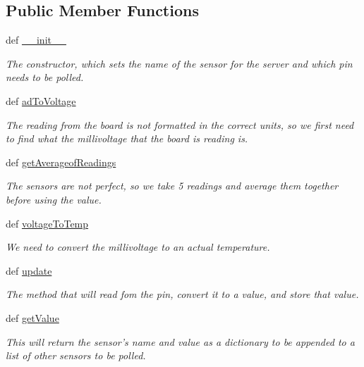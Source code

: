 \subsection*{Public Member Functions}
\begin{DoxyCompactItemize}
\item 
def \hyperlink{classsensing_1_1_temperature_sensor_a35bf393ac9f3fadc1bcec9e32eb9a7d6}{\-\_\-\-\_\-init\-\_\-\-\_\-}
\begin{DoxyCompactList}\small\item\em The constructor, which sets the name of the sensor for the server and which pin needs to be polled. \end{DoxyCompactList}\item 
def \hyperlink{classsensing_1_1_temperature_sensor_aaeb85a07038568c56f0e3543815068d7}{ad\-To\-Voltage}
\begin{DoxyCompactList}\small\item\em The reading from the board is not formatted in the correct units, so we first need to find what the millivoltage that the board is reading is. \end{DoxyCompactList}\item 
def \hyperlink{classsensing_1_1_temperature_sensor_a5129c7aa8fabc66c80b645186518ecac}{get\-Averageof\-Readings}
\begin{DoxyCompactList}\small\item\em The sensors are not perfect, so we take 5 readings and average them together before using the value. \end{DoxyCompactList}\item 
def \hyperlink{classsensing_1_1_temperature_sensor_aaf6d138cf7d3155597a11b359fa9afe7}{voltage\-To\-Temp}
\begin{DoxyCompactList}\small\item\em We need to convert the millivoltage to an actual temperature. \end{DoxyCompactList}\item 
def \hyperlink{classsensing_1_1_temperature_sensor_adce48cedf1d9fdd706c374ec1217bd94}{update}
\begin{DoxyCompactList}\small\item\em The method that will read fom the pin, convert it to a value, and store that value. \end{DoxyCompactList}\item 
def \hyperlink{classsensing_1_1_temperature_sensor_a556e30e17858efbb95521dfafe6ee0cc}{get\-Value}
\begin{DoxyCompactList}\small\item\em This will return the sensor's name and value as a dictionary to be appended to a list of other sensors to be polled. \end{DoxyCompactList}\end{DoxyCompactItemize}


